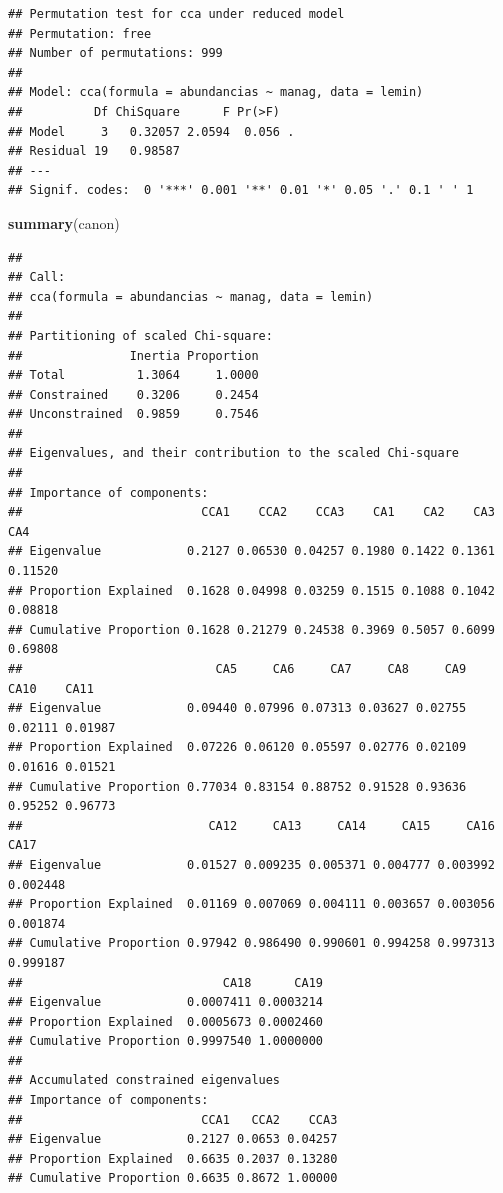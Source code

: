 \documentclass[
]{article}
\newenvironment{Shaded}{\begin{snugshade}}{\end{snugshade}}
\newcommand{\FunctionTok}[1]{\textcolor[rgb]{0.13,0.29,0.53}{\textbf{#1}}}
\newcommand{\NormalTok}[1]{#1}
\begin{document}
\begin{verbatim}
## Permutation test for cca under reduced model
## Permutation: free
## Number of permutations: 999
## 
## Model: cca(formula = abundancias ~ manag, data = lemin)
##          Df ChiSquare      F Pr(>F)  
## Model     3   0.32057 2.0594  0.056 .
## Residual 19   0.98587                
## ---
## Signif. codes:  0 '***' 0.001 '**' 0.01 '*' 0.05 '.' 0.1 ' ' 1
\end{verbatim}

\begin{Shaded}
\begin{Highlighting}[]
\FunctionTok{summary}\NormalTok{(canon)}
\end{Highlighting}
\end{Shaded}

\begin{verbatim}
## 
## Call:
## cca(formula = abundancias ~ manag, data = lemin) 
## 
## Partitioning of scaled Chi-square:
##               Inertia Proportion
## Total          1.3064     1.0000
## Constrained    0.3206     0.2454
## Unconstrained  0.9859     0.7546
## 
## Eigenvalues, and their contribution to the scaled Chi-square 
## 
## Importance of components:
##                         CCA1    CCA2    CCA3    CA1    CA2    CA3     CA4
## Eigenvalue            0.2127 0.06530 0.04257 0.1980 0.1422 0.1361 0.11520
## Proportion Explained  0.1628 0.04998 0.03259 0.1515 0.1088 0.1042 0.08818
## Cumulative Proportion 0.1628 0.21279 0.24538 0.3969 0.5057 0.6099 0.69808
##                           CA5     CA6     CA7     CA8     CA9    CA10    CA11
## Eigenvalue            0.09440 0.07996 0.07313 0.03627 0.02755 0.02111 0.01987
## Proportion Explained  0.07226 0.06120 0.05597 0.02776 0.02109 0.01616 0.01521
## Cumulative Proportion 0.77034 0.83154 0.88752 0.91528 0.93636 0.95252 0.96773
##                          CA12     CA13     CA14     CA15     CA16     CA17
## Eigenvalue            0.01527 0.009235 0.005371 0.004777 0.003992 0.002448
## Proportion Explained  0.01169 0.007069 0.004111 0.003657 0.003056 0.001874
## Cumulative Proportion 0.97942 0.986490 0.990601 0.994258 0.997313 0.999187
##                            CA18      CA19
## Eigenvalue            0.0007411 0.0003214
## Proportion Explained  0.0005673 0.0002460
## Cumulative Proportion 0.9997540 1.0000000
## 
## Accumulated constrained eigenvalues
## Importance of components:
##                         CCA1   CCA2    CCA3
## Eigenvalue            0.2127 0.0653 0.04257
## Proportion Explained  0.6635 0.2037 0.13280
## Cumulative Proportion 0.6635 0.8672 1.00000
\end{verbatim}
\end{document}
